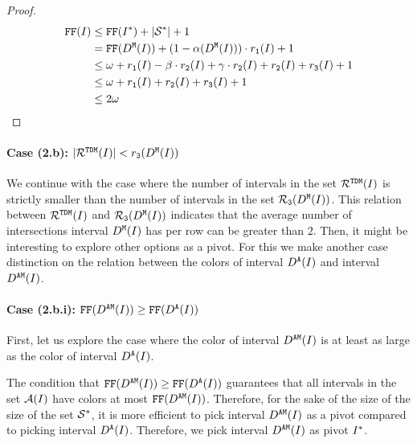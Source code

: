 {\begin{proof}
    \begin{align*}
        \text{\texttt{FF}}(I) &\leq \text{\texttt{FF}}(I^*) + |\mathcal{S}^*| + 1\\
        &= \text{\texttt{FF}}(D^\texttt{M}(I)) + (1 - \alpha(D^\texttt{M}(I))) \cdot r_\texttt{1}(I) + 1 \\
        &\leq \omega + r_\texttt{1}(I) - \beta  \cdot r_\texttt{2}(I) + \gamma  \cdot r_\texttt{2}(I) + r_\texttt{2}(I) + r_\texttt{3}(I) + 1 \\
        &\leq \omega + r_\texttt{1}(I) + r_\texttt{2}(I) + r_\texttt{3}(I) + 1 \\
        &\leq 2\omega
    \end{align*}
\end{proof}
\paragraph*{Case (2.b): $|\mathcal{R}^{\texttt{TDM}}(I)| < r_\texttt{3}(D^\texttt{M}(I))$}
We continue with the case where the number of intervals in the set $\mathcal{R}^{\texttt{TDM}}(I)$ is strictly smaller than the number of intervals in the set $\mathcal{R}_\texttt{3}(D^\texttt{M}(I))$.
This relation between $\mathcal{R}^{\texttt{TDM}}(I)$ and $\mathcal{R}_\texttt{3}(D^\texttt{M}(I))$ indicates that the average number of intersections interval $D^\texttt{M}(I)$ has per row can be greater than $2$.
Then, it might be interesting to explore other options as a pivot.
For this we make another case distinction on the relation between the colors of interval $D^\texttt{A}(I)$ and interval $D^\texttt{AM}(I)$.

\paragraph*{Case (2.b.i): $\text{\texttt{FF}}(D^\texttt{AM}(I)) \geq \text{\texttt{FF}}(D^\texttt{A}(I))$}
First, let us explore the case where the color of interval $D^\texttt{AM}(I)$ is at least as large as the color of interval $D^\texttt{A}(I)$.

\medskip

The condition that $\text{\texttt{FF}}(D^\texttt{AM}(I)) \geq \text{\texttt{FF}}(D^\texttt{A}(I))$ guarantees that all intervals in the set $\mathcal{A}(I)$ have colors at most $\text{\texttt{FF}}(D^\texttt{AM}(I))$.
Therefore, for the sake of the size of the size of the set $\mathcal{S}^*$, it is more efficient to pick interval $D^\texttt{AM}(I)$ as a pivot compared to picking interval $D^\texttt{A}(I)$.
Therefore, we pick interval $D^\texttt{AM}(I)$ as pivot $I^*$.

\medskip


}

